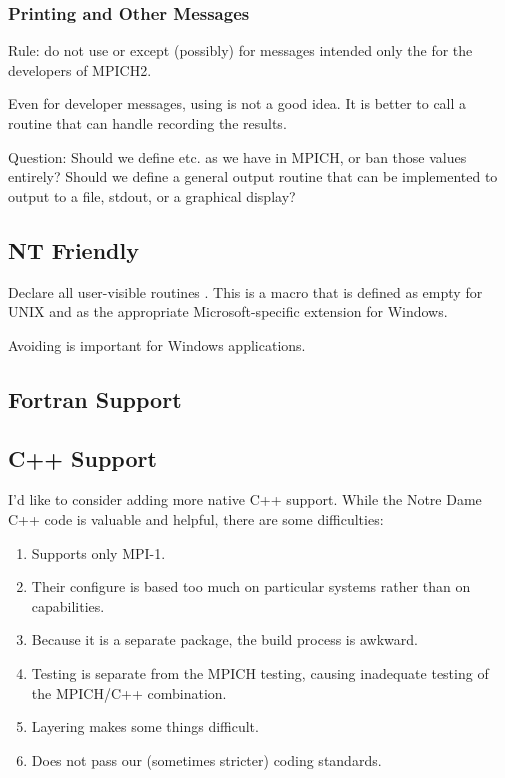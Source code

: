 \documentclass{article}
\begin{document}
\subsubsection{Printing and Other Messages}
Rule: do not use  or  except (possibly) for
messages intended only the for the developers of MPICH2.

Even for developer messages, using  is not a good idea.
It is better to call a routine that can handle recording the results.


Question: Should we define  etc. as we have in MPICH, or
ban those values entirely?  Should we define a general output routine
that can be implemented to output to a file, stdout, or a graphical display?

\subsection{NT Friendly}

Declare all user-visible routines .
This is a 
macro that is defined as empty for UNIX and as the appropriate
Microsoft-specific extension for Windows.

Avoiding  is important for Windows applications.

\subsection{Fortran Support}

\subsection{C++ Support}

I'd like to consider adding more native C++ support.  While the Notre
Dame C++ code is valuable and helpful, there are some difficulties:
\begin{enumerate}
\item Supports only MPI-1.
\item Their configure is based too much on particular systems rather than on
capabilities. 
\item Because it is a separate package, the build process is awkward.
\item Testing is separate from the MPICH testing, causing inadequate
testing of the MPICH/C++ combination.
\item Layering makes some things difficult. 
\item Does not pass our (sometimes stricter) coding standards. 
\end{enumerate}
\end{document}
